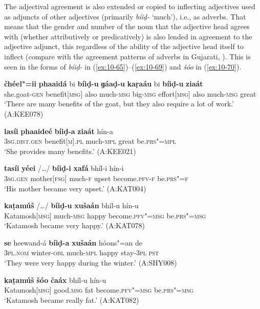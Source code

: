 The adjectival agreement is also extended or copied to inflecting adjectives used as adjuncts of other adjectives (primarily \textit{bíiḍ-} `much'), i.e., as adverbs. That means that the gender and number of the noun that the adjective head agrees with (whether attributively or predicatively) is also lended in agreement to the adjective adjunct, this regardless of the ability of the adjective head itself to inflect (compare with the agreement patterns of adverbs in Gujarati, \citealt{hookjoshi1991}). This is seen in the forms of \textit{bíiḍ-} in (\ref{ex:10-65})--(\ref{ex:10-69}) and \textit{šóo} in (\ref{ex:10-70}).
\begin{exe}
\ex
\label{ex:10-65}
\gll {\ob}\textbf{čhéel"=ii} \textbf{phaaidá}{\cb} bi {\ob}\textbf{bíiḍ-u} \textbf{ɡáaḍ-u}{\cb} {\ob}\textbf{kaṛaáu}{\cb} bi {\ob}\textbf{bíiḍ-u} \textbf{ziaát}{\cb} \\
she.goat-\textsc{gen} benefit[\textsc{msg}] also much-\textsc{msg} big-\textsc{msg}  effort[\textsc{msg}] also much-\textsc{msg} great \\
\glt `There are many benefits of the goat, but they also require a lot of work.' (A:KEE078)

\ex
\label{ex:10-66}
\gll {\ob}\textbf{lasíi} \textbf{phaaideé}{\cb} {\ob}\textbf{bíiḍ-a} \textbf{ziaát}{\cb} hín-a \\
\textsc{3sg}.\textsc{dist.gen} benefit[\textsc{m}].\textsc{pl} much-\textsc{mpl} great  be.\textsc{prs"=mpl} \\
\glt `She provides many benefits.' (A:KEE021)

\ex
\label{ex:10-67}
\gll {\ob}\textbf{tasíi} \textbf{yéei}{\cb} /{\ldots}/ {\ob}\textbf{bíiḍ-i} \textbf{xafá}{\cb} bhíl-i hín-i\\
\textsc{3sg.gen} mother[\textsc{fsg}] {} much-\textsc{f} upset become.\textsc{pfv-f} be.\textsc{prs"=f} \\
\glt `His mother became very upset.' (A:KAT004)

\ex
\label{ex:10-68}
\gll {\ob}\textbf{kaṭamúš}{\cb} /{\ldots}/ {\ob}\textbf{bíiḍ-u} \textbf{xušaán}{\cb} bhíl-u hín-u \\
Katamosh[\textsc{msg}] {} much-\textsc{msg} happy become.\textsc{pfv"=msg} be.\textsc{prs"=msg}\\
\glt `Katamosh became very happy.' (A:KAT078)

\ex
\label{ex:10-69}
\gll {\ob}\textbf{se}{\cb} heewand-á {\ob}\textbf{bíiḍ-a} \textbf{xušaán}{\cb} hóons"=an de \\
\textsc{3pl.nom} winter-\textsc{obl} much-\textsc{mpl} happy stay-\textsc{3pl} \textsc{pst} \\
\glt `They were very happy during the winter.' (A:SHY008)

\ex
\label{ex:10-70}
\gll {\ob}\textbf{kaṭamúš}{\cb} {\ob}\textbf{šóo} \textbf{čaáx}{\cb} bhíl-u hín-u \\
Katamosh[\textsc{msg}] good.\textsc{msg} fat become.\textsc{pfv"=msg}  be.\textsc{prs"=msg} \\
\glt `Katamosh became really fat.' (A:KAT082)
\end{exe}

